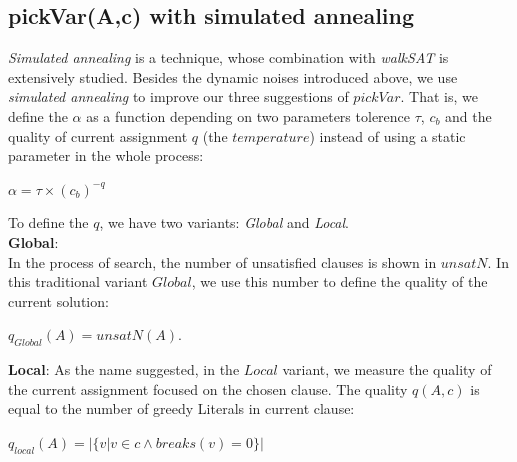 \documentclass[12pt,a4paper,twoside]{scrartcl}
\numberwithin{equation}{section}
\begin{document}
\subsection{pickVar(A,c) with simulated annealing}
\emph{Simulated annealing} is a technique, whose combination with \emph{walkSAT} is extensively studied. Besides the dynamic noises introduced above, we use \emph{simulated annealing} to improve our three suggestions of $pickVar$. That is, we define the $\alpha$ as a function depending on two parameters tolerence $\tau$, $c_b$ and the quality of current assignment $q$ (the $temperature$) instead of using a static parameter in the whole process:
\begin{center}
 $\alpha = \tau \times (c_b)^{-q}$\\
 \end{center}
To define the $q$, we have two variants: \emph{Global} and \emph{Local}.\\
\textbf{Global}:\\
In the process of search, the number of unsatisfied clauses is shown in $unsatN$. In this traditional variant $Global$, we use this number to define the quality of the current solution:
\begin{center}
 $q_{Global}(A) =unsatN(A)$.\\
\end{center}
\textbf{Local}:
As the name suggested, in the $Local$ variant, we measure the quality of the current assignment focused on the chosen clause. The quality  $q(A,c)$ is equal to the number of greedy Literals in current clause:
\begin{center}
 $q_{local}(A) =|\{ v| v \in  c \land breaks(v) = 0\}|$\\
 \end{center}
\end{document}
